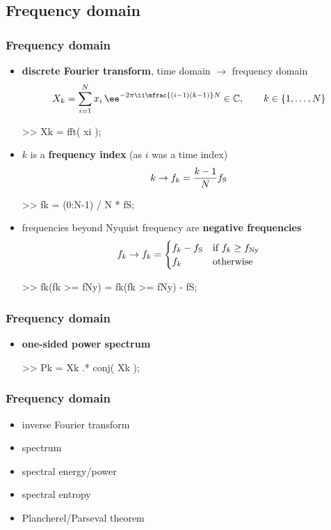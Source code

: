 
\subsection{Frequency domain}

\begin{frame}[fragile]
	\frametitle{Frequency domain}
	\begin{itemize}
		\item \textbf{discrete Fourier transform}, time domain $\rightarrow$ frequency domain
			\begin{align*}
				X_k=\sum_{i=1}^Nx_i\,\ee^{-2\pi\ii\mfrac{(i-1)(k-1)}N}\in\mathbb C,\qquad k\in\{1,\ldots,N\}
			\end{align*}
			\begin{code}
>> Xk = fft( xi );
			\end{code}
		\item $k$ is a \textbf{frequency index} (as $i$ was a time index)
			\begin{align*}
				k\rightarrow f_k=\frac{k-1}Nf_{\textrm S}
			\end{align*}
			\begin{code}
>> fk = (0:N-1) / N * fS;
			\end{code}
		\item frequencies beyond Nyquist frequency are \textbf{negative frequencies}
			\begin{align*}
				f_k\rightarrow f_k=\begin{cases}f_k-f_{\textrm S}&\textrm{if $f_k\ge f_{\textrm{Ny}}$}\\f_k&\textrm{otherwise}\end{cases}
			\end{align*}
			\begin{code}
>> fk(fk >= fNy) = fk(fk >= fNy) - fS;
			\end{code}
	\end{itemize}
\end{frame}

\begin{frame}[fragile]
	\frametitle{Frequency domain}
	\begin{itemize}
		\item \textbf{one-sided power spectrum}
			\begin{code}
>> Pk = Xk .* conj( Xk );
			\end{code}
	\end{itemize}
\end{frame}

\begin{frame}
	\frametitle{Frequency domain}
	\begin{itemize}
		\item inverse Fourier transform
		\item spectrum
		\item spectral energy/power
		\item spectral entropy
		\item Plancherel/Parseval theorem
	\end{itemize}
\end{frame}

